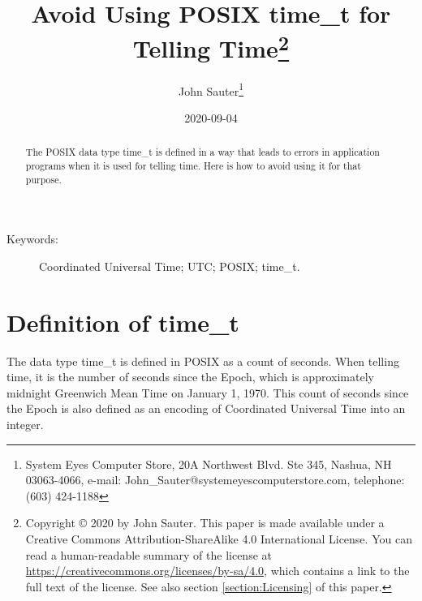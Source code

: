 \documentclass[letterpaper,twoside]{article}
\begin{document}
\title{Avoid Using POSIX {\ttfamily time\_t} for Telling
  Time\footnote{Copyright
    {\copyright} 2020 by John Sauter.
    This paper is made available under a
    Creative Commons Attribution-ShareAlike 4.0 International License.
    You can read a human-readable summary of the license at
    \url{https://creativecommons.org/licenses/by-sa/4.0}, which contains
    a link to the full text of the license.
    See also section \ref{section:Licensing} of this paper.}
}
\author{John Sauter\footnote{
    System Eyes Computer Store,
    20A Northwest Blvd.  Ste 345,
    Nashua, NH  03063-4066,
    e-mail: John\_Sauter@systemeyescomputerstore.com,
    telephone: (603) 424-1188}}
\date{2020-09-04}
\maketitle
\begin{abstract}
  The POSIX data type {\ttfamily time\_t} is defined in a way that leads
  to errors in application programs when it is used for telling time.
  Here is how to avoid using it for that purpose.
\end{abstract}
\begin{description}
\item[Keywords:]Coordinated Universal Time; UTC; POSIX; time\_t.
\end{description}
  
\newpage

\section{Definition of {\ttfamily time\_t}}
The data type {\ttfamily time\_t} is defined in POSIX\citep{7582338}
as a count of seconds.
When telling time, it is the number of seconds
since the Epoch, which is approximately midnight Greenwich Mean Time on
January 1, 1970.  This count of seconds since the Epoch is also
defined as an encoding of Coordinated Universal Time into an integer.
\end{document}
